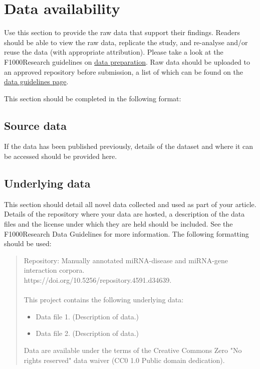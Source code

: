 \documentclass[10pt,a4paper]{article}
\begin{document}
\section*{Data availability} %
Use this section to provide the raw data that support their findings. Readers should be able to view the raw data, replicate the study, and re-analyse and/or reuse the data (with appropriate attribution). Please take a look at the F1000Research guidelines on \href{https://www.f1000research.com/for-authors/data-guidelines}{data preparation}.
Raw data should be uploaded to an approved repository before submission, a list of which can be found on the \href{https://f1000research.com/for-authors/data-guidelines#hosting}{data guidelines page}.

This section should be completed in the following format:

\subsection*{Source data}

If the data has been published previously, details of the dataset and where it can be accessed should be provided here.

\subsection*{Underlying data}

This section should detail all novel data collected and used as part of your article. Details of the repository where your data are hosted, a description of the data files and the license under which they are held should be included. See the F1000Research Data Guidelines for more information. The following formatting should be used:
\begin{quote}
Repository: Manually annotated miRNA-disease and miRNA-gene interaction corpora.\\
https://doi.org/10.5256/repository.4591.d34639.
\\
\\
This project contains the following underlying data:
\begin{itemize}
	\item Data file 1. (Description of data.)
	\item Data file 2. (Description of data.)
\end{itemize}

Data are available under the terms of the Creative Commons Zero "No rights reserved" data waiver (CC0 1.0 Public domain dedication).
\end{quote}
\end{document}
